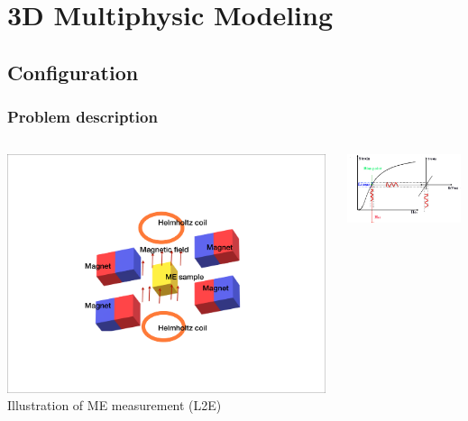 \documentclass[compress]{beamer}
\begin{document}
\section{3D Multiphysic Modeling}
\subsection{Configuration}

\begin{frame}\frametitle{Problem description}
\begin{columns}[totalwidth=\textwidth] 
   \begin{column}{.45\textwidth}
   \centering
	\includegraphics[width=0.99\textwidth]{Graphic/02_IllusMEmeasu.pdf}
 	Illustration of ME measurement (L2E)
	\end{column}
	\begin{column}{.55\textwidth}
	\centering
 	\includegraphics[width=0.99\textwidth]{Graphic/02_biaspoint2.pdf}

\end{column}
\end{columns}
\end{frame}
\end{document}
